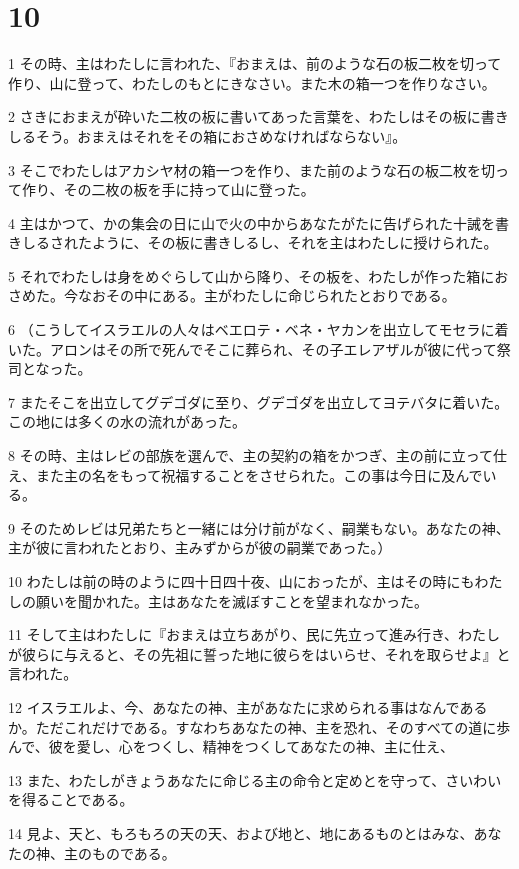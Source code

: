 \chapter{10}

\par 1 その時、主はわたしに言われた、『おまえは、前のような石の板二枚を切って作り、山に登って、わたしのもとにきなさい。また木の箱一つを作りなさい。
\par 2 さきにおまえが砕いた二枚の板に書いてあった言葉を、わたしはその板に書きしるそう。おまえはそれをその箱におさめなければならない』。
\par 3 そこでわたしはアカシヤ材の箱一つを作り、また前のような石の板二枚を切って作り、その二枚の板を手に持って山に登った。
\par 4 主はかつて、かの集会の日に山で火の中からあなたがたに告げられた十誡を書きしるされたように、その板に書きしるし、それを主はわたしに授けられた。
\par 5 それでわたしは身をめぐらして山から降り、その板を、わたしが作った箱におさめた。今なおその中にある。主がわたしに命じられたとおりである。
\par 6 （こうしてイスラエルの人々はベエロテ・ベネ・ヤカンを出立してモセラに着いた。アロンはその所で死んでそこに葬られ、その子エレアザルが彼に代って祭司となった。
\par 7 またそこを出立してグデゴダに至り、グデゴダを出立してヨテバタに着いた。この地には多くの水の流れがあった。
\par 8 その時、主はレビの部族を選んで、主の契約の箱をかつぎ、主の前に立って仕え、また主の名をもって祝福することをさせられた。この事は今日に及んでいる。
\par 9 そのためレビは兄弟たちと一緒には分け前がなく、嗣業もない。あなたの神、主が彼に言われたとおり、主みずからが彼の嗣業であった。）
\par 10 わたしは前の時のように四十日四十夜、山におったが、主はその時にもわたしの願いを聞かれた。主はあなたを滅ぼすことを望まれなかった。
\par 11 そして主はわたしに『おまえは立ちあがり、民に先立って進み行き、わたしが彼らに与えると、その先祖に誓った地に彼らをはいらせ、それを取らせよ』と言われた。
\par 12 イスラエルよ、今、あなたの神、主があなたに求められる事はなんであるか。ただこれだけである。すなわちあなたの神、主を恐れ、そのすべての道に歩んで、彼を愛し、心をつくし、精神をつくしてあなたの神、主に仕え、
\par 13 また、わたしがきょうあなたに命じる主の命令と定めとを守って、さいわいを得ることである。
\par 14 見よ、天と、もろもろの天の天、および地と、地にあるものとはみな、あなたの神、主のものである。
